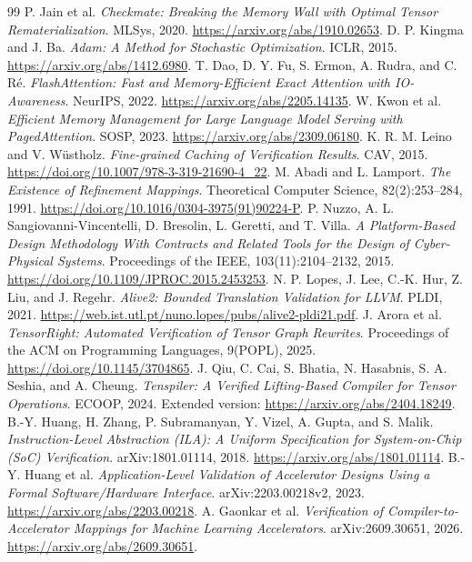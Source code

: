 \documentclass[11pt]{article}
\begin{document}
\begin{thebibliography}{99}
 P. Jain et al. \emph{Checkmate: Breaking the Memory Wall with Optimal Tensor Rematerialization}. MLSys, 2020. \url{https://arxiv.org/abs/1910.02653}.
 D. P. Kingma and J. Ba. \emph{Adam: A Method for Stochastic Optimization}. ICLR, 2015. \url{https://arxiv.org/abs/1412.6980}.
 T. Dao, D. Y. Fu, S. Ermon, A. Rudra, and C. R\'e. \emph{FlashAttention: Fast and Memory-Efficient Exact Attention with IO-Awareness}. NeurIPS, 2022. \url{https://arxiv.org/abs/2205.14135}.
 W. Kwon et al. \emph{Efficient Memory Management for Large Language Model Serving with PagedAttention}. SOSP, 2023. \url{https://arxiv.org/abs/2309.06180}.
 K. R. M. Leino and V. W\"ustholz. \emph{Fine-grained Caching of Verification Results}. CAV, 2015. \url{https://doi.org/10.1007/978-3-319-21690-4_22}.
 M. Abadi and L. Lamport. \emph{The Existence of Refinement Mappings}. Theoretical Computer Science, 82(2):253--284, 1991. \url{https://doi.org/10.1016/0304-3975(91)90224-P}.
 P. Nuzzo, A. L. Sangiovanni-Vincentelli, D. Bresolin, L. Geretti, and T. Villa. \emph{A Platform-Based Design Methodology With Contracts and Related Tools for the Design of Cyber-Physical Systems}. Proceedings of the IEEE, 103(11):2104--2132, 2015. \url{https://doi.org/10.1109/JPROC.2015.2453253}.
 N. P. Lopes, J. Lee, C.-K. Hur, Z. Liu, and J. Regehr. \emph{Alive2: Bounded Translation Validation for LLVM}. PLDI, 2021. \url{https://web.ist.utl.pt/nuno.lopes/pubs/alive2-pldi21.pdf}.
 J. Arora et al. \emph{TensorRight: Automated Verification of Tensor Graph Rewrites}. Proceedings of the ACM on Programming Languages, 9(POPL), 2025. \url{https://doi.org/10.1145/3704865}.
 J. Qiu, C. Cai, S. Bhatia, N. Hasabnis, S. A. Seshia, and A. Cheung. \emph{Tenspiler: A Verified Lifting-Based Compiler for Tensor Operations}. ECOOP, 2024. Extended version: \url{https://arxiv.org/abs/2404.18249}.
 B.-Y. Huang, H. Zhang, P. Subramanyan, Y. Vizel, A. Gupta, and S. Malik. \emph{Instruction-Level Abstraction (ILA): A Uniform Specification for System-on-Chip (SoC) Verification}. arXiv:1801.01114, 2018. \url{https://arxiv.org/abs/1801.01114}.
 B.-Y. Huang et al. \emph{Application-Level Validation of Accelerator Designs Using a Formal Software/Hardware Interface}. arXiv:2203.00218v2, 2023. \url{https://arxiv.org/abs/2203.00218}.
 A. Gaonkar et al. \emph{Verification of Compiler-to-Accelerator Mappings for Machine Learning Accelerators}. arXiv:2609.30651, 2026. \url{https://arxiv.org/abs/2609.30651}.

\end{thebibliography}
\end{document}
